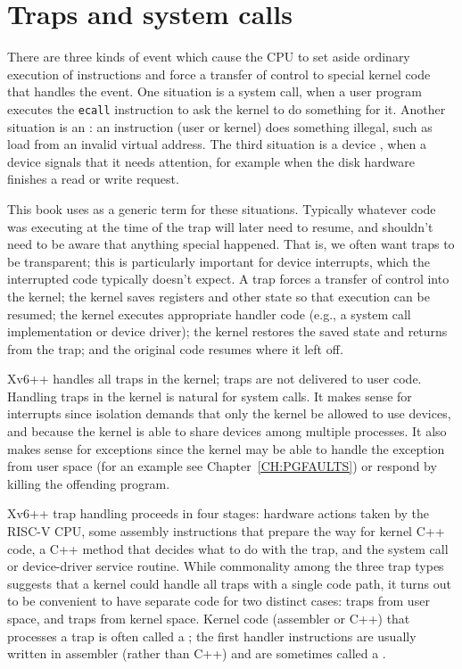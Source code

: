 \chapter{Traps and system calls}
\label{CH:TRAP}

There are three kinds of event which cause the CPU to set
aside ordinary execution of instructions and force a
transfer of control to special kernel code that handles the event. One
situation is a system call, when a user program
executes the {\tt ecall} instruction to ask the kernel to do
something for it. Another situation is an :
an instruction (user or kernel) does something illegal, such as
load from an invalid virtual address. The third situation is a
device , when a device signals that it needs
attention, for example when the disk hardware finishes a read or write
request.

This book uses  as a generic term for these
situations. Typically whatever code was executing at the time of the
trap will later need to resume, and shouldn't need to be aware that
anything special happened. That is, we often want traps to be
transparent; this is particularly important for device interrupts, which the
interrupted code typically doesn't expect.
A trap forces a transfer of control into the kernel; the kernel saves
registers and other state so that execution can be resumed; the kernel
executes appropriate handler code (e.g., a system call implementation
or device driver); the kernel restores the saved state and returns
from the trap; and the original code resumes where it left off.

Xv6++ handles all traps in the kernel; traps are not delivered to user
code. Handling traps in the kernel is natural for system calls. It
makes sense for interrupts since isolation demands that only the
kernel be allowed to use devices,
and because the kernel is able to
share devices among multiple processes.
It also makes sense for exceptions since the kernel may be able to
handle the exception from user space (for an example see
Chapter~\ref{CH:PGFAULTS}) or respond by killing the offending
program.

Xv6++ trap handling proceeds in four stages: hardware actions taken by
the RISC-V CPU, some assembly instructions that prepare the way for
kernel C++ code, a C++ method that decides what to do with the trap,
and the system call or device-driver service routine. While
commonality among the three trap types suggests that a kernel could
handle all traps with a single code path, it turns out to be
convenient to have separate code for
two distinct cases: traps from user space, and traps from kernel space.
Kernel code (assembler or C++) that
processes a trap is often called a ;
the first handler instructions are usually written in assembler
(rather than C++) and are sometimes called a .

